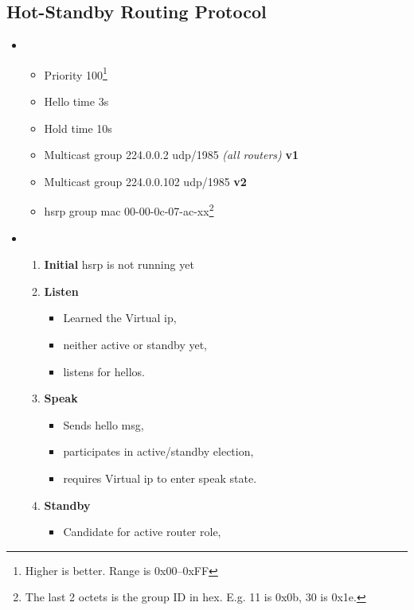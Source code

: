 \newpage

\subsection[HSRP]{Hot-Standby Routing Protocol}

\begin{itemize}
    \item {}
    \begin{itemize}
        \item Priority 100\footnote{Higher is better. Range is 0x00--0xFF}
        \item Hello time 3s
        \item Hold time 10s
        \item Multicast group 224.0.0.2 udp/1985 \textit{(all routers)} {\scriptsize \textbf{v1}}
        \item Multicast group 224.0.0.102 udp/1985 {\scriptsize \textbf{v2}}
        \item \gls{hsrp} group mac 00-00-0c-07-ac-xx\footnote{The last 2 octets is the group ID in hex. E.g. 11 is 0x0b, 30 is 0x1e.}
    \end{itemize}
    \item {}
    \begin{enumerate}
        \item \textbf{Initial} \gls{hsrp} is not running yet
        \item \textbf{Listen}
        \begin{itemize}
            \item Learned the Virtual \gls{ip},
            \item neither active or standby yet,
            \item listens for hellos.
        \end{itemize}
        \item \textbf{Speak}
        \begin{itemize}
            \item Sends hello msg,
            \item participates in active/standby election,
            \item requires Virtual \gls{ip} to enter speak state.
        \end{itemize}
        \item \textbf{Standby}
        \begin{itemize}
            \item Candidate for active router role,

\end{itemize}
\end{enumerate}
\end{itemize}
